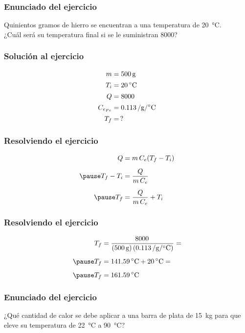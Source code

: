\documentclass[14pt]{beamer}
\begin{document}
\begin{frame}
\frametitle{Enunciado del ejercicio}
Quinientos gramos de hierro se encuentran a una temperatura de \SI{20}{\degreeCelsius}.
\\
\bigskip
\pause
¿Cuál será su temperatura final si se le suministran \SI{8000}{\cal}?
\end{frame}
\begin{frame}
\frametitle{Solución al ejercicio}
\vspace*{-0.5cm}
\pause
\begin{align*}
m &= \SI{500}{\gram} \\[0.15em]
T_{i} &= \SI{20}{\degreeCelsius} \\[0.15em]
Q &= \SI{8000}{\cal} \\[0.15em]
C_{e_{Fe}} &= \SI{0.113}{\cal\per\gram\per\degreeCelsius} \\[0.15em]
T_{f} &= \, ?
\end{align*}
\end{frame}
\begin{frame}
\frametitle{Resolviendo el ejercicio}
\pause
\begin{eqnarray*}
\begin{aligned}
Q &= m \, C_{e} (T_{f} - T_{i}) \\[0.5em] \pause
T_{f} - T_{i} &= \dfrac{Q}{m \, C_{e}} \\[0.5em] \pause
T_{f} &= \dfrac{Q}{m \, C_{e}} + T_{i}
\end{aligned}
\end{eqnarray*}
\end{frame}
\begin{frame}
\frametitle{Resolviendo el ejercicio}
\pause
\begin{eqnarray*}
\begin{aligned}
T_{f} &= \dfrac{\SI{8000}{\cal}}{(\SI{500}{\gram})\left( \SI{0.113}{\cal\per\gram\per\degreeCelsius} \right)} = \\[0.5em] \pause
T_{f} &= \SI{141.59}{\degreeCelsius} + \SI{20}{\degreeCelsius} = \\[0.5em] \pause
T_{f} &= \SI{161.59}{\degreeCelsius}
\end{aligned}
\end{eqnarray*}
\end{frame}
\begin{frame}
\frametitle{Enunciado del ejercicio}
¿Qué cantidad de calor se debe aplicar a una barra de plata de \SI{15}{\kilo\gram} para que eleve su temperatura de \SI{22}{\degreeCelsius} a \SI{90}{\degreeCelsius}?
\end{frame}
\end{document}
